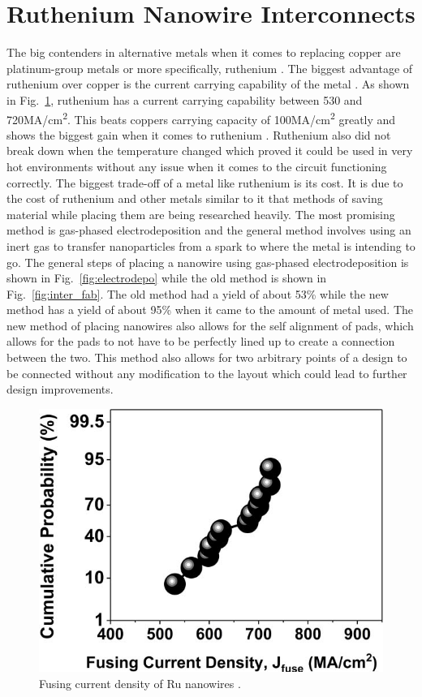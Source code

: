 \documentclass[conference]{IEEEtran}
\begin{document}
\section{Ruthenium Nanowire Interconnects}
The big contenders in alternative metals when it comes to replacing copper are platinum-group metals or more specifically,
ruthenium \cite{7968937}. The biggest advantage of ruthenium over copper is the current carrying capability of the metal \cite{7968937}.
As shown in Fig.~\ref{fig:curr_ruth}, ruthenium has a current carrying capability between 530 and 720MA/cm\textsuperscript{2}. This
beats coppers carrying capacity of 100MA/cm\textsuperscript{2} greatly and shows the biggest gain when it comes to ruthenium \cite{7968937}.
Ruthenium also did not break down when the temperature changed which proved it could be used in very hot environments without any issue
when it comes to the circuit functioning correctly.
The biggest trade-off of a metal like ruthenium is its cost. It is due to the cost of ruthenium and other metals similar to it that
methods of saving material while placing them are being researched heavily. The most promising method is gas-phased electrodeposition and
the general method involves using an inert gas to transfer nanoparticles from a spark to where the metal is intending to go. The general
steps of placing a nanowire using gas-phased electrodeposition is shown in Fig.~\ref{fig:electrodepo} while the old method is shown in
Fig.~\ref{fig:inter_fab}. The old method had a yield of about 53\% \cite{7968937} while the new method has a yield of about 95\% \cite{8605857}
when it came to the amount of metal used. The new method of placing nanowires also allows for the self alignment of pads, which allows for
the pads to not have to be perfectly lined up to create a connection between the two. This method also allows for two arbitrary points of a
design to be connected without any modification to the layout which could lead to further design improvements.
\begin{figure}
    \centering
    \includegraphics[width=\linewidth]{figures/curr_ruth.png}
    \caption{Fusing current density of Ru nanowires \cite{7968937}.}\label{fig:curr_ruth}
\end{figure}
\end{document}
